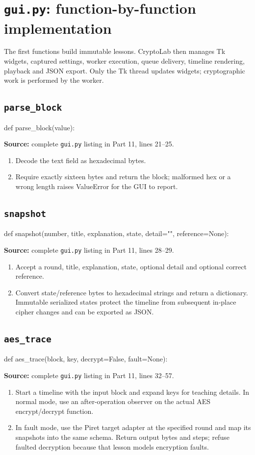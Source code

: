 \section{\texttt{gui.py}: function-by-function implementation}
The first functions build immutable lessons. CryptoLab then manages Tk widgets, captured settings, worker execution, queue delivery, timeline rendering, playback and JSON export. Only the Tk thread updates widgets; cryptographic work is performed by the worker.
\subsection{\texttt{parse\_\allowbreak{}block}}
\begin{lightcode}
def parse_block(value):
\end{lightcode}
\noindent\textbf{Source:} complete \texttt{gui.py} listing in Part 11, lines 21--25.
\begin{enumerate}
\item Decode the text field as hexadecimal bytes.
\item Require exactly sixteen bytes and return the block; malformed hex or a wrong length raises ValueError for the GUI to report.
\end{enumerate}
\subsection{\texttt{snapshot}}
\begin{lightcode}
def snapshot(number, title, explanation, state, detail="", reference=None):
\end{lightcode}
\noindent\textbf{Source:} complete \texttt{gui.py} listing in Part 11, lines 28--29.
\begin{enumerate}
\item Accept a round, title, explanation, state, optional detail and optional correct reference.
\item Convert state/reference bytes to hexadecimal strings and return a dictionary. Immutable serialized states protect the timeline from subsequent in-place cipher changes and can be exported as JSON.
\end{enumerate}
\subsection{\texttt{aes\_\allowbreak{}trace}}
\begin{lightcode}
def aes_trace(block, key, decrypt=False, fault=None):
\end{lightcode}
\noindent\textbf{Source:} complete \texttt{gui.py} listing in Part 11, lines 32--57.
\begin{enumerate}
\item Start a timeline with the input block and expand keys for teaching details. In normal mode, use an after-operation observer on the actual AES encrypt/decrypt function.
\item In fault mode, use the Piret target adapter at the specified round and map its snapshots into the same schema. Return output bytes and steps; refuse faulted decryption because that lesson models encryption faults.
\end{enumerate}

